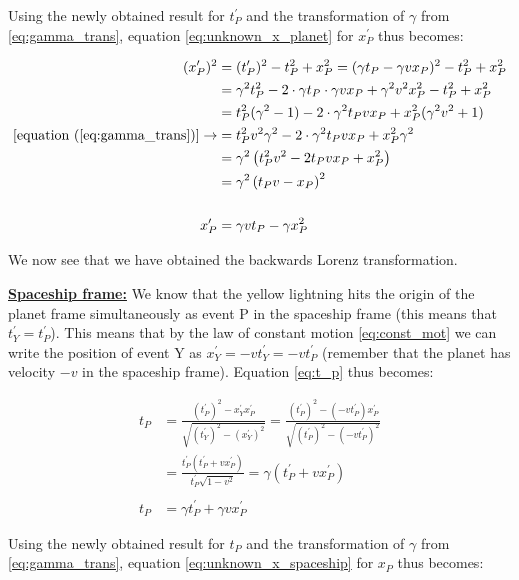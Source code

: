 \documentclass[a4paper,10pt,english]{article}
\begin{document}
\begin{enumerate}
Using the newly obtained result for $t^{\prime}_{P}$ and the transformation of $\gamma$ from \ref{eq:gamma_trans}, equation \ref{eq:unknown_x_planet} for $x^{\prime}_{P}$ thus becomes:

\begin{align*}
(x^{\prime}_{P})^{2}&=(t^{\prime}_{P})^{2}-t_{P}^{2}+x_{P}^{2}=(\gamma t_{P}-\gamma vx_{P})^{2}-t_{P}^{2}+x_{P}^{2}\\
&=\gamma^{2}t_{P}^{2}-2\cdot\gamma t_{P}\cdot\gamma vx_{P}+\gamma^{2}v^{2}x_{P}^{2}-t_{P}^{2}+x_{P}^{2}\\
&=t_{P}^{2}(\gamma^{2}-1)-2\cdot\gamma^{2} t_{P}vx_{P}+x_{P}^{2}(\gamma^{2}v^{2}+1)\\
[\text{equation }(\ref{eq:gamma_trans})]\rightarrow&=t_{P}^{2}v^{2}\gamma^{2}-2\cdot\gamma^{2} t_{P}vx_{P}+x_{P}^{2}\gamma^{2}\\
&=\gamma^{2}\left(t_{P}^{2}v^{2}-2t_{P}vx_{P}+x_{P}^{2}\right)\\
&=\gamma^{2}\left(t_{P}v-x_{P}\right)^{2}\\
\\
x^{\prime}_{P}&=\gamma vt_{P}-\gamma x_{P}^{2}
\end{align*}

We now see that we have obtained the backwards Lorenz transformation.

\underline{\bf{Spaceship frame:}} We know that the yellow lightning hits the origin of the planet frame simultaneously as event P in the spaceship frame (this means that $t_{Y}^{\prime}=t_{P}^{\prime}$). This means that by the law of constant motion \ref{eq:const_mot} we can write the position of event Y as $x_{Y}^{\prime}=-vt_{Y}^{\prime}=-vt_{P}^{\prime}$ (remember that the planet has velocity $-v$ in the spaceship frame). Equation \ref{eq:t_p} thus becomes: 

\begin{align*}
t_{P}&=\frac{(t_{P}^{\prime})^{2}-x_{Y}^{\prime}x_{P}^{\prime}}{\sqrt{(t_{Y}^{\prime})^2-(x_{Y}^{\prime})^2}}=\frac{(t_{P}^{\prime})^{2}-(-vt_{P}^{\prime})x_{P}^{\prime}}{\sqrt{(t_{P}^{\prime})^2-(-vt_{P}^{\prime})^2}}\\
&=\frac{t_{P}^{\prime}\left(t_{P}^{\prime}+vx_{P}^{\prime}\right)}{t_{P}^{\prime}\sqrt{1-v^2}}=\gamma(t_{P}^{\prime}+vx_{P}^{\prime})\\
\\
t_{P}&=\gamma t_{P}^{\prime}+\gamma vx_{P}^{\prime}
\end{align*}

Using the newly obtained result for $t_{P}$ and the transformation of $\gamma$ from \ref{eq:gamma_trans}, equation \ref{eq:unknown_x_spaceship} for $x_{P}$ thus becomes:


\end{enumerate}
\end{document}
